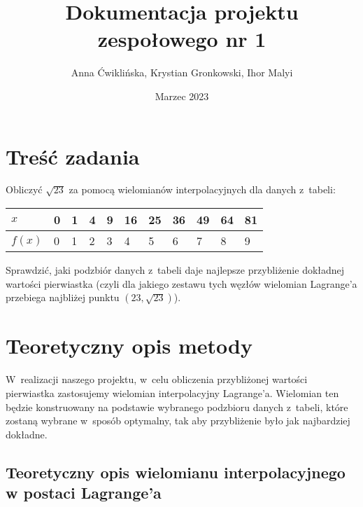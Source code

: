 \documentclass[12pt]{article}
\title{Dokumentacja projektu zespołowego nr 1}
\author{Anna Ćwiklińska, Krystian Gronkowski, Ihor Malyi}
\date{Marzec 2023}
\begin{document}
\maketiwtle

\section{Treść zadania}
Obliczyć $\sqrt{23}$ za pomocą wielomianów interpolacyjnych dla danych z~tabeli:

\begin{table}[h]
\centering
\begin{tabular}{l|llllllllll}
$x$    & 0 & 1 & 4 & 9 & 16 & 25 & 36 & 49 & 64 & 81 \\ \hline
$f(x)$ & 0 & 1 & 2 & 3 & 4  & 5  & 6  & 7  & 8  & 9  \\
\end{tabular}
\end{table}

Sprawdzić, jaki podzbiór danych z~tabeli daje najlepsze przybliżenie dokładnej wartości pierwiastka (czyli dla jakiego zestawu tych węzłów wielomian Lagrange’a przebiega najbliżej punktu $(23, \sqrt{23})$).

\section{Teoretyczny opis metody}
W~realizacji naszego projektu, w~celu obliczenia przybliżonej wartości pierwiastka zastosujemy wielomian interpolacyjny Lagrange'a. Wielomian ten będzie konstruowany na podstawie wybranego podzbioru danych z~tabeli, które zostaną wybrane w~sposób optymalny, tak aby przybliżenie było jak najbardziej dokładne.

\subsection{Teoretyczny opis wielomianu interpolacyjnego w postaci Lagrange'a}
\end{document}
